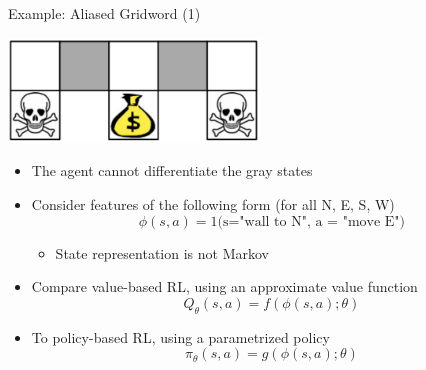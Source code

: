 \begin{frame}[c]{Example: Aliased Gridword (1)}
	
	\begin{center}
		\includegraphics[width=0.5\textwidth]{images/gridworld1.png}
	\end{center}
	
	\begin{itemize}
		\item The agent \alert{cannot} differentiate the gray states
		\item Consider features of the following form (for all N, E, S, W)
		$$\phi(s,a) = 1\text{(s="wall to N", a = "move E")}$$
		\vspace{-1em}
		\begin{itemize}
			\item State representation is not Markov
		\end{itemize}
		\item Compare value-based RL, using an approximate value function
		$$Q_\theta (s,a) = f(\phi(s,a); \theta)$$
		\item To policy-based RL, using a parametrized policy
		$$\pi_\theta(s,a) = g(\phi(s,a); \theta) $$ 
	\end{itemize}
	
\end{frame}
